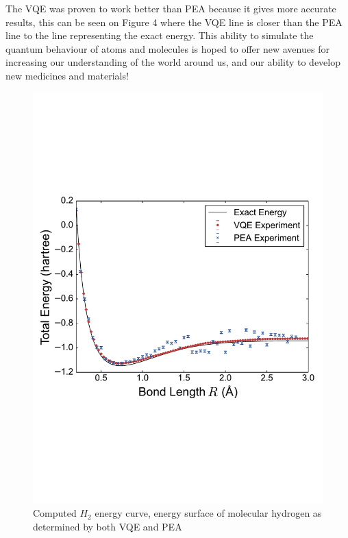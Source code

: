 \documentclass[14pt,landscape,color=UCLdarkred,margin=3cm]{uclposter}
\begin{document}
\begin{multicols}{3}
The VQE was proven to work better than PEA because it gives more accurate results, this can be seen on Figure 4 where the VQE line is closer than the PEA line to the line representing the exact energy. This ability to simulate the quantum behaviour of atoms and molecules is hoped to offer new avenues for increasing our understanding of the world around us, and our ability to develop new medicines and materials!

\begin{figure}[H]
  \begin{center}
  \includegraphics[scale=1.2]{result.pdf}
  \caption{Computed $H_2$ energy curve, energy surface of molecular hydrogen as determined by both VQE and PEA}
  \end{center}
    
 

   
\end{figure}



\end{multicols}
	
\end{document}

